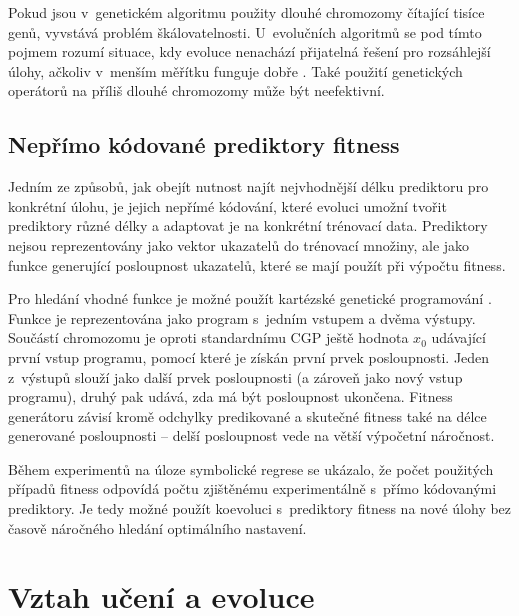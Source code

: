 Pokud jsou v~genetickém algoritmu použity dlouhé chromozomy čítající tisíce genů, vyvstává problém škálovatelnosti. U~evolučních algoritmů se pod tímto pojmem rozumí situace, kdy evoluce nenachází přijatelná řešení pro rozsáhlejší úlohy, ačkoliv v~menším měřítku funguje dobře \cite{SikuKomjathy}. Také použití genetických operátorů na příliš dlouhé chromozomy může být neefektivní.


\subsection{Nepřímo kódované prediktory fitness}
\label{secIndirectPredictors}

Jedním ze způsobů, jak obejít nutnost najít nejvhodnější délku prediktoru pro konkrétní úlohu, je jejich nepřímé kódování, které evoluci umožní tvořit prediktory různé délky a adaptovat je na konkrétní trénovací data. Prediktory nejsou reprezentovány jako vektor ukazatelů do trénovací množiny, ale jako funkce generující posloupnost ukazatelů, které se mají použít při výpočtu fitness.

Pro hledání vhodné funkce je možné použít kartézské genetické programování \cite{Siku2015}. Funkce je reprezentována jako program s~jedním vstupem a dvěma výstupy. Součástí chromozomu je oproti standardnímu CGP ještě hodnota $x_0$ udávající první vstup programu, pomocí které je získán první prvek posloupnosti. Jeden z~výstupů slouží jako další prvek posloupnosti (a zároveň jako nový vstup programu), druhý pak udává, zda má být posloupnost ukončena. Fitness generátoru závisí kromě odchylky predikované a skutečné fitness také na délce generované posloupnosti -- delší posloupnost vede na větší výpočetní náročnost.

Během experimentů na úloze symbolické regrese se ukázalo, že počet použitých případů fitness odpovídá počtu zjištěnému experimentálně s~přímo kódovanými prediktory. Je tedy možné použít koevoluci s~prediktory fitness na nové úlohy bez časově náročného hledání optimálního nastavení.


\section{Vztah učení a evoluce}
\label{secColearning}

